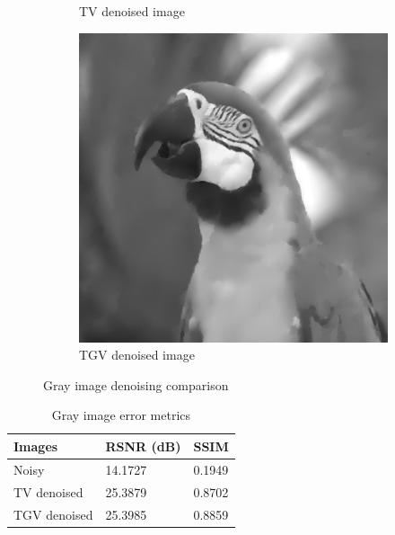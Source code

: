 \documentclass{article}
\begin{document}
\begin{figure}[htbp]
\begin{subfigure}[b]{0.24\textwidth}
        \caption{TV denoised image}
        \label{fig:TVdenoised_gray}
    \end{subfigure}
    \hfill
    \begin{subfigure}[b]{0.24\textwidth}
        \centering
        \includegraphics[width=\textwidth]{images/TGVdenoised_gray.png}
        \caption{TGV denoised image}
        \label{fig:TGVdenoised_gray}
    \end{subfigure}
    \vspace{.3cm}

    \caption{Gray image denoising comparison}
    \label{fig:gray_comparison}
\end{figure}

\begin{table}[htbp]
    \centering
    \begin{tabular}{| l | l | l |} 
        \hline
        \textbf{Images} & \textbf{RSNR (dB)} & \textbf{SSIM} \\ [0.5ex] 
        \hline\hline
        Noisy & 14.1727 & 0.1949 \\ 
        \hline
        TV denoised & 25.3879 & 0.8702 \\
        \hline
        TGV denoised & 25.3985 & 0.8859 \\
        \hline
    \end{tabular}
    \caption{Gray image error metrics}
    \label{tab:gray_metrics}
\end{table}
\end{document}
